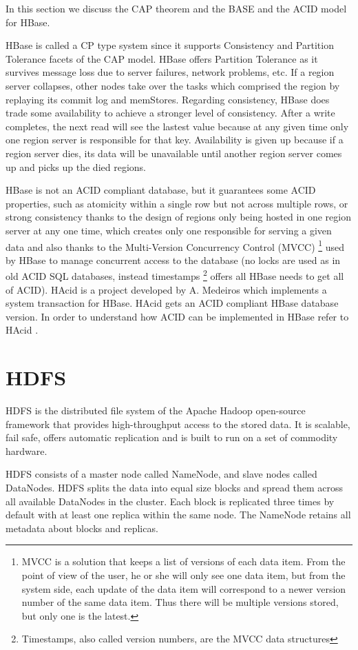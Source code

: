 In this section we discuss the CAP theorem and the BASE and the ACID model for HBase. 
\par
HBase is called a CP type system since it supports Consistency and Partition Tolerance facets of the CAP model.
HBase offers Partition Tolerance as it survives message loss due to server failures, network problems, etc. If a region server collapses, other nodes take over the tasks which comprised the region by replaying its commit log and memStores.
Regarding consistency, HBase does trade some availability to achieve a stronger level of consistency. After a write completes, the next read will see the lastest value because at any given time only one region server is responsible for that key.
Availability is given up because if a region server dies, its data will be unavailable until another region server comes up and picks up the died regions.
\par
HBase is not an ACID compliant database, but it guarantees some ACID properties, such as atomicity within a single row but not across multiple rows, or strong consistency thanks to the design of regions only being hosted in one region server at any one time, which creates only one responsible for serving a given data and also thanks to the Multi-Version Concurrency Control (MVCC) \footnote{MVCC \cite{bernstein1983multiversion} is a solution that keeps a list of versions of each data item. From the point of view of the user, he or she will only see one data item, but from the system side, each update of the data item will correspond to a newer version number of the same data item. Thus there will be multiple versions stored, but only one is the latest.} used by HBase to manage concurrent access to the database (no locks are used as in old ACID SQL databases, instead timestamps \footnote{Timestamps, also called version numbers, are the MVCC data structures} offers all HBase needs to get all of ACID). HAcid is a project developed by A. Medeiros which implements a system transaction for HBase. HAcid gets an ACID compliant HBase database version. In order to understand how ACID can be implemented in HBase refer to HAcid \cite{HAcid} .



\section{HDFS}
HDFS is the distributed file system of the Apache Hadoop open-source framework that provides high-throughput access to the stored data. It is scalable, fail safe, offers automatic replication and is built to run on a set of commodity hardware.
\par
HDFS consists of a master node called NameNode, and slave nodes called DataNodes. HDFS splits the data into equal size blocks and spread them across all available DataNodes in the cluster. Each block is replicated three times by default with at least one replica within the same node. The NameNode retains all metadata about blocks and replicas.

